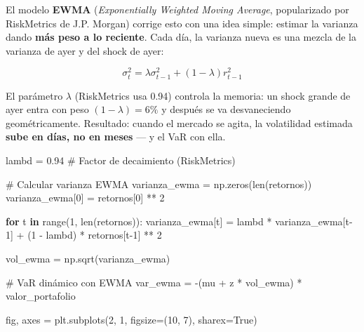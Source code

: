 \documentclass[
  spanish,
  letterpaper,
  DIV=11,
  numbers=noendperiod]{scrreprt}
\newenvironment{Shaded}{\begin{snugshade}}{\end{snugshade}}
\newcommand{\BuiltInTok}[1]{\textcolor[rgb]{0.00,0.23,0.31}{#1}}
\newcommand{\CommentTok}[1]{\textcolor[rgb]{0.37,0.37,0.37}{#1}}
\newcommand{\ControlFlowTok}[1]{\textcolor[rgb]{0.00,0.23,0.31}{\textbf{#1}}}
\newcommand{\DecValTok}[1]{\textcolor[rgb]{0.68,0.00,0.00}{#1}}
\newcommand{\FloatTok}[1]{\textcolor[rgb]{0.68,0.00,0.00}{#1}}
\newcommand{\KeywordTok}[1]{\textcolor[rgb]{0.00,0.23,0.31}{\textbf{#1}}}
\newcommand{\NormalTok}[1]{\textcolor[rgb]{0.00,0.23,0.31}{#1}}
\newcommand{\OperatorTok}[1]{\textcolor[rgb]{0.37,0.37,0.37}{#1}}
\newcommand{\VariableTok}[1]{\textcolor[rgb]{0.07,0.07,0.07}{#1}}
\begin{document}
El modelo \textbf{EWMA} (\emph{Exponentially Weighted Moving Average},
popularizado por RiskMetrics de J.P. Morgan) corrige esto con una idea
simple: estimar la varianza dando \textbf{más peso a lo reciente}. Cada
día, la varianza nueva es una mezcla de la varianza de ayer y del shock
de ayer:

\[\sigma_t^2 = \lambda \sigma_{t-1}^2 + (1-\lambda) r_{t-1}^2\]

El parámetro \(\lambda\) (RiskMetrics usa 0.94) controla la memoria: un
shock grande de ayer entra con peso \((1-\lambda) = 6\%\) y después se
va desvaneciendo geométricamente. Resultado: cuando el mercado se agita,
la volatilidad estimada \textbf{sube en días, no en meses} --- y el VaR
con ella.

\begin{Shaded}
\begin{Highlighting}[]
\NormalTok{lambd }\OperatorTok{=} \FloatTok{0.94}  \CommentTok{\# Factor de decaimiento (RiskMetrics)}

\CommentTok{\# Calcular varianza EWMA}
\NormalTok{varianza\_ewma }\OperatorTok{=}\NormalTok{ np.zeros(}\BuiltInTok{len}\NormalTok{(retornos))}
\NormalTok{varianza\_ewma[}\DecValTok{0}\NormalTok{] }\OperatorTok{=}\NormalTok{ retornos[}\DecValTok{0}\NormalTok{] }\OperatorTok{**} \DecValTok{2}

\ControlFlowTok{for}\NormalTok{ t }\KeywordTok{in} \BuiltInTok{range}\NormalTok{(}\DecValTok{1}\NormalTok{, }\BuiltInTok{len}\NormalTok{(retornos)):}
\NormalTok{    varianza\_ewma[t] }\OperatorTok{=}\NormalTok{ lambd }\OperatorTok{*}\NormalTok{ varianza\_ewma[t}\OperatorTok{{-}}\DecValTok{1}\NormalTok{] }\OperatorTok{+}\NormalTok{ (}\DecValTok{1} \OperatorTok{{-}}\NormalTok{ lambd) }\OperatorTok{*}\NormalTok{ retornos[t}\OperatorTok{{-}}\DecValTok{1}\NormalTok{] }\OperatorTok{**} \DecValTok{2}

\NormalTok{vol\_ewma }\OperatorTok{=}\NormalTok{ np.sqrt(varianza\_ewma)}

\CommentTok{\# VaR dinámico con EWMA}
\NormalTok{var\_ewma }\OperatorTok{=} \OperatorTok{{-}}\NormalTok{(mu }\OperatorTok{+}\NormalTok{ z }\OperatorTok{*}\NormalTok{ vol\_ewma) }\OperatorTok{*}\NormalTok{ valor\_portafolio}

\NormalTok{fig, axes }\OperatorTok{=}\NormalTok{ plt.subplots(}\DecValTok{2}\NormalTok{, }\DecValTok{1}\NormalTok{, figsize}\OperatorTok{=}\NormalTok{(}\DecValTok{10}\NormalTok{, }\DecValTok{7}\NormalTok{), sharex}\OperatorTok{=}\VariableTok{True}\NormalTok{)}


\end{Highlighting}
\end{Shaded}
\end{document}
